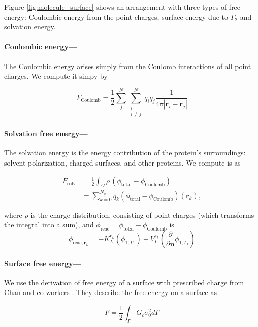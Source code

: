 
Figure \ref{fig:molecule_surface} shows an arrangement with three types of free energy: Coulombic energy from the point charges, surface energy due to $\Gamma_2$ and solvation energy. 

\medskip

\paragraph*{Coulombic energy---}

The Coulombic energy arises simply from the Coulomb interactions of all point charges. We compute it simpy by

\begin{equation} \label{eq:coul_energy}
F_\text{Coulomb} = \frac{1}{2} \sum_j^N\sum^N_{\substack{i\\ i\neq j}} q_iq_j\frac{1}{4\pi |\mathbf{r}_i-\mathbf{r}_j|}
\end{equation}

\paragraph*{Solvation free energy---}

The solvation energy is the energy contribution of the protein's surroundings: solvent polarization, charged surfaces, and other proteins. We compute is as

\begin{align} \label{eq:solv_energy}
F_{\text{solv}} &= \frac{1}{2} \int_{\Omega} \rho \,(\phi_{\text{total}} - \phi_{\text{Coulomb}}) \\
&= \sum_{k=0}^{N_q} q_k (\phi_{\text{total}} - \phi_{\text{Coulomb}})(\mathbf{r}_k),
\end{align}

\noindent where $\rho$ is the charge distribution, consisting of point charges (which transforms the integral into a sum), and $\phi_\text{reac} = \phi_{\text{total}} - \phi_{\text{Coulomb}}$ is
%
\begin{equation} \label{eq:phi_reac_bem}
\phi_{\text{reac},\mathbf{r}_k} = -K_{L}^{\mathbf{r}_k}(\phi_{1,\Gamma_1}) + V_{L}^{\mathbf{r}_k} \left(\frac{\partial}{\partial \mathbf{n}}\phi_{1,\Gamma_1} \right) 
\end{equation}

\paragraph*{Surface free energy---}

We use the derivation of free energy of a surface with prescribed charge from Chan and co-workers \cite{ChanMitchell1983,CarnieChan1993}. They describe the free energy on a surface as

\begin{equation} \label{eq:energy_surf}
F = \frac{1}{2} \int_{\Gamma} G_c \sigma_0^2 d\Gamma 
\end{equation} 
